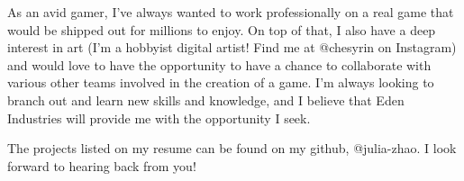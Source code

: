 \documentclass[11pt, a4paper]{awesome-cv}
\begin{document}
\begin{cvletter}
As an avid gamer, I've always wanted to work professionally on a real game that would be shipped out for millions to enjoy. On top of that, I also have a deep interest in art (I'm a hobbyist digital artist! Find me at @chesyrin on Instagram) and would love to have the opportunity to have a chance to collaborate with various other teams involved in the creation of a game. I'm always looking to branch out and learn new skills and knowledge, and I believe that Eden Industries will provide me with the opportunity I seek.

The projects listed on my resume can be found on my github, @julia-zhao. I look forward to hearing back from you!
\end{cvletter}

\makeletterclosing
\end{document}

